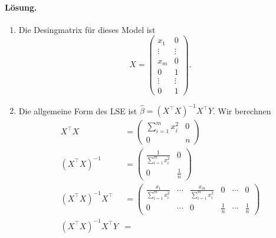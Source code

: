 \paragraph*{Lösung.}
\begin{enumerate}
    \item Die Desingmatrix für dieses Model ist
            \begin{equation*}
                X = \left(
                \begin{array}{cc}
                    x_1 & 0 \\
                    \vdots & \vdots \\
                    x_m & 0 \\
                    0 & 1 \\
                    \vdots & \vdots \\
                    0 & 1 
                \end{array}
                \right).
            \end{equation*}
        \item Die allgemeine Form des LSE ist 
            $\hat \beta = \left( X^\top X \right)^{-1} X^\top Y$. Wir berechnen
            \begin{align*}
                X^\top X &= \left(
                \begin{array}{cc}
                    \sum_{i=1}^{m} x_i^2 & 0 \\
                    0 & n 
                \end{array}
                \right) \\
                \left( X^\top X \right)^{-1} &= \left(
                \begin{array}{cc}
                    \frac{1}{\sum_{i=1}^{m} x_i^2} & 0 \\
                    0 & \frac{1}{n} 
                \end{array}
                \right) \\
                \left( X^\top X \right)^{-1} X^\top &= \left(
                \begin{array}{cccccc}
                    \frac{x_1}{\sum_{i=1}^{m} x_i^2} & \cdots & \frac{x_m}{\sum_{i=1}^{m} x_i^2} & 
                        0 & \cdots & 0 \\
                        0& \cdots &0& \frac{1}{n} & \cdots & \frac{1}{n} 
                \end{array}
                \right) \\
                \left( X^\top X \right)^{-1} X^\top Y &= 

\end{align*}
\end{enumerate}
